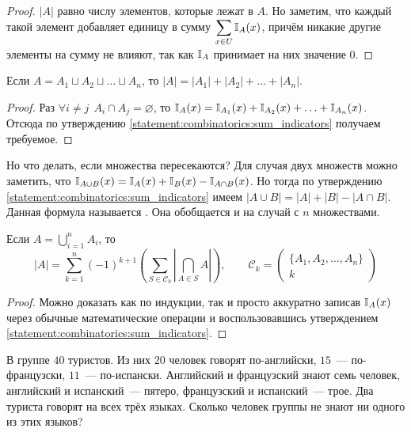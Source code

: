 \begin{proof}
    $ |A| $ равно числу элементов, которые лежат в $ A $.
    Но заметим, что каждый такой элемент добавляет единицу в сумму $ \displaystyle \sum_{x \in U} \mathbb{I}_A(x) $,
    причём никакие другие элементы на сумму не влияют, так как $ \mathbb{I}_A $ принимает на них значение $ 0 $.
\end{proof}

\begin{corollary}
    Если $ A = A_1 \sqcup A_2 \sqcup \ldots \sqcup A_n $, то $ |A| = |A_1| + |A_2| + \ldots + |A_n| $.
\end{corollary}

\begin{proof}
    Раз $ \forall i \neq j \;\, A_i \cap A_j = \varnothing $, то $ \mathbb{I}_A(x) = \mathbb{I}_{A_1}(x) + \mathbb{I}_{A_2}(x) + \ldots + \mathbb{I}_{A_n}(x) $.
    Отсюда по утверждению \ref{statement:combinatorics:sum_indicators} получаем требуемое.
\end{proof}

Но что делать, если множества пересекаются?
Для случая двух множеств можно заметить, что $ \mathbb{I}_{A \cup B}(x) = \mathbb{I}_A(x) + \mathbb{I}_B(x) - \mathbb{I}_{A \cap B}(x) $.
Но тогда по утверждению \ref{statement:combinatorics:sum_indicators} имеем $ |A \cup B| = |A| + |B| - |A \cap B| $.
Данная формула называется .
Она обобщается и на случай с $ n $ множествами.

\begin{lemma}
    Если $ \displaystyle A = \bigcup_{i=1}^n A_i $, то
    \[
        |A| = \sum_{k=1}^n (-1)^{k+1} \left( \sum_{S \in \mathcal{C}_k} \left| \bigcap_{A \in S} A \right| \right), \qquad
        \mathcal{C}_k = \begin{pmatrix} \{ A_1, A_2, \ldots, A_n \} \\ k \end{pmatrix}
    \]
\end{lemma}

\begin{proof}
    Можно доказать как по индукции, так и просто аккуратно записав $ \mathbb{I}_A(x) $ через обычные математические операции
    и воспользовавшись утверждением \ref{statement:combinatorics:sum_indicators}.
\end{proof}

\begin{Exercise}[counter=SecExercise]
    \noindent
    В группе $ 40 $ туристов.
    Из них $ 20 $ человек говорят по-английски, $ 15 $~--- по-французски, $ 11 $~--- по-испански.
    Английский и французский знают семь человек, английский и испанский~--- пятеро, французский и испанский~--- трое.
    Два туриста говорят на всех трёх языках.
    Сколько человек группы не знают ни одного из этих языков?
\end{Exercise}

